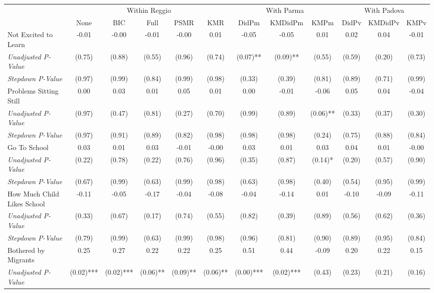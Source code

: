 \begin{tabular}{l c c c c c c c c c c c}
\toprule
& \multicolumn{5}{c}{Within Reggio} & \multicolumn{3}{c}{With Parma} & \multicolumn{3}{c}{With Padova} \\\cmidrule(lr){2-6} \cmidrule(lr){7-9} \cmidrule(lr){10-12}
 & None & BIC & Full & PSMR & KMR & DidPm & KMDidPm & KMPm & DidPv & KMDidPv & KMPv \\
\midrule
Not Excited to Learn & -0.01 & -0.00 & -0.01 & -0.00 & 0.01 & -0.05 & -0.05 & 0.01 & 0.02 & 0.04 & -0.01 \\
\quad \textit{Unadjusted P-Value} & (0.75) & (0.88) & (0.55) & (0.96) & (0.74) & (0.07)** & (0.09)** & (0.55) & (0.59) & (0.20) & (0.73) \\
\quad \textit{Stepdown P-Value} & (0.97) & (0.99) & (0.84) & (0.99) & (0.98) & (0.33) & (0.39) & (0.81) & (0.89) & (0.71) & (0.99) \\
Problems Sitting Still & 0.00 & 0.03 & 0.01 & 0.05 & 0.01 & 0.00 & -0.01 & -0.06 & 0.05 & 0.04 & -0.04 \\
\quad \textit{Unadjusted P-Value} & (0.97) & (0.47) & (0.81) & (0.27) & (0.70) & (0.99) & (0.89) & (0.06)** & (0.33) & (0.37) & (0.30) \\
\quad \textit{Stepdown P-Value} & (0.97) & (0.91) & (0.89) & (0.82) & (0.98) & (0.98) & (0.98) & (0.24) & (0.75) & (0.88) & (0.84) \\
Go To School & 0.03 & 0.01 & 0.03 & -0.01 & -0.00 & 0.03 & 0.01 & 0.03 & 0.04 & 0.01 & -0.00 \\
\quad \textit{Unadjusted P-Value} & (0.22) & (0.78) & (0.22) & (0.76) & (0.96) & (0.35) & (0.87) & (0.14)* & (0.20) & (0.57) & (0.90) \\
\quad \textit{Stepdown P-Value} & (0.67) & (0.99) & (0.63) & (0.99) & (0.98) & (0.63) & (0.98) & (0.40) & (0.54) & (0.95) & (0.99) \\
How Much Child Likes School & -0.11 & -0.05 & -0.17 & -0.04 & -0.08 & -0.04 & -0.14 & 0.01 & -0.10 & -0.09 & -0.11 \\
\quad \textit{Unadjusted P-Value} & (0.33) & (0.67) & (0.17) & (0.74) & (0.55) & (0.82) & (0.39) & (0.89) & (0.56) & (0.62) & (0.36) \\
\quad \textit{Stepdown P-Value} & (0.79) & (0.99) & (0.63) & (0.99) & (0.98) & (0.96) & (0.81) & (0.90) & (0.89) & (0.95) & (0.84) \\
Bothered by Migrants & 0.25 & 0.27 & 0.22 & 0.22 & 0.25 & 0.51 & 0.44 & -0.09 & 0.20 & 0.22 & 0.15 \\
\quad \textit{Unadjusted P-Value} & (0.02)*** & (0.02)*** & (0.06)** & (0.09)** & (0.06)** & (0.00)*** & (0.02)*** & (0.43) & (0.23) & (0.21) & (0.16) \\

\end{tabular}
